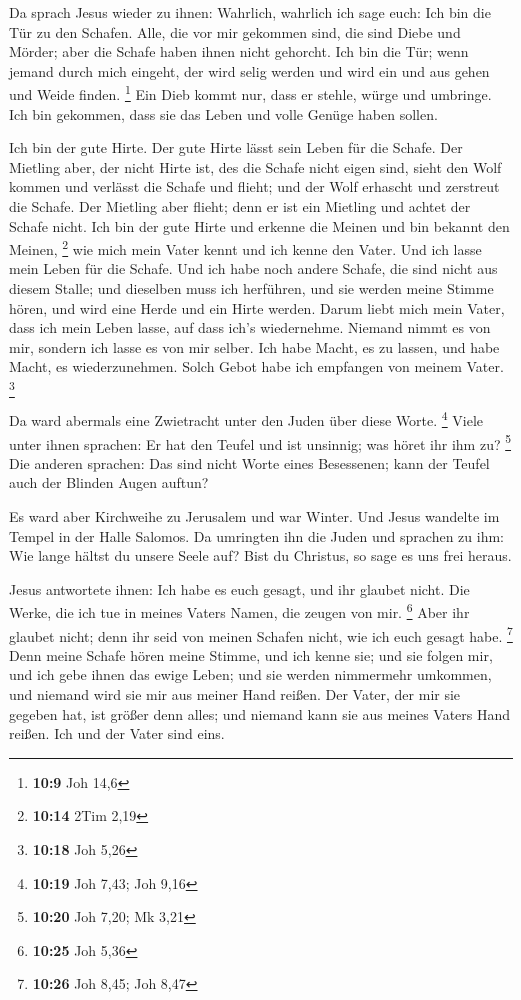  Da sprach Jesus wieder zu ihnen: Wahrlich, wahrlich ich
sage euch: Ich bin die Tür zu den Schafen.  Alle, die vor
mir gekommen sind, die sind Diebe und Mörder; aber die Schafe haben
ihnen nicht gehorcht.  Ich bin die Tür; wenn jemand durch
mich eingeht, der wird selig werden und wird ein und aus gehen und Weide
finden. \footnote{\textbf{10:9} Joh 14,6}  Ein Dieb kommt
nur, dass er stehle, würge und umbringe. Ich bin gekommen, dass sie das
Leben und volle Genüge haben sollen.

 Ich bin der gute Hirte. Der gute Hirte lässt sein Leben
für die Schafe.  Der Mietling aber, der nicht Hirte ist,
des die Schafe nicht eigen sind, sieht den Wolf kommen und verlässt die
Schafe und flieht; und der Wolf erhascht und zerstreut die Schafe.
 Der Mietling aber flieht; denn er ist ein Mietling und
achtet der Schafe nicht.  Ich bin der gute Hirte und
erkenne die Meinen und bin bekannt den Meinen, \footnote{\textbf{10:14}
  2Tim 2,19}  wie mich mein Vater kennt und ich kenne den
Vater. Und ich lasse mein Leben für die Schafe.  Und ich
habe noch andere Schafe, die sind nicht aus diesem Stalle; und dieselben
muss ich herführen, und sie werden meine Stimme hören, und wird eine
Herde und ein Hirte werden.  Darum liebt mich mein Vater,
dass ich mein Leben lasse, auf dass ich's wiedernehme. 
Niemand nimmt es von mir, sondern ich lasse es von mir selber. Ich habe
Macht, es zu lassen, und habe Macht, es wiederzunehmen. Solch Gebot habe
ich empfangen von meinem Vater. \footnote{\textbf{10:18} Joh 5,26}

 Da ward abermals eine Zwietracht unter den Juden über
diese Worte. \footnote{\textbf{10:19} Joh 7,43; Joh 9,16}
 Viele unter ihnen sprachen: Er hat den Teufel und ist
unsinnig; was höret ihr ihm zu? \footnote{\textbf{10:20} Joh 7,20; Mk
  3,21}  Die anderen sprachen: Das sind nicht Worte eines
Besessenen; kann der Teufel auch der Blinden Augen auftun?

 Es ward aber Kirchweihe zu Jerusalem und war Winter.
 Und Jesus wandelte im Tempel in der Halle Salomos.
 Da umringten ihn die Juden und sprachen zu ihm: Wie
lange hältst du unsere Seele auf? Bist du Christus, so sage es uns frei
heraus.

 Jesus antwortete ihnen: Ich habe es euch gesagt, und ihr
glaubet nicht. Die Werke, die ich tue in meines Vaters Namen, die zeugen
von mir. \footnote{\textbf{10:25} Joh 5,36}  Aber ihr
glaubet nicht; denn ihr seid von meinen Schafen nicht, wie ich euch
gesagt habe. \footnote{\textbf{10:26} Joh 8,45; Joh 8,47}
 Denn meine Schafe hören meine Stimme, und ich kenne sie;
und sie folgen mir,  und ich gebe ihnen das ewige Leben;
und sie werden nimmermehr umkommen, und niemand wird sie mir aus meiner
Hand reißen.  Der Vater, der mir sie gegeben hat, ist
größer denn alles; und niemand kann sie aus meines Vaters Hand reißen.
 Ich und der Vater sind eins.


